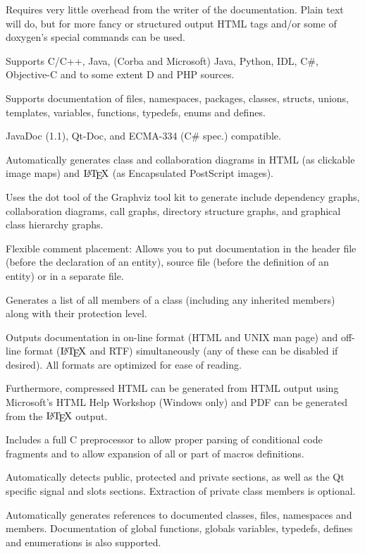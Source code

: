 \begin{DoxyItemize}
\item Requires very little overhead from the writer of the documentation. Plain text will do, but for more fancy or structured output HTML tags and/or some of doxygen's special commands can be used. 
\item Supports C/C++, Java, (Corba and Microsoft) Java, Python, IDL, C\#, Objective-\/C and to some extent D and PHP sources. 
\item Supports documentation of files, namespaces, packages, classes, structs, unions, templates, variables, functions, typedefs, enums and defines. 
\item JavaDoc (1.1), Qt-\/Doc, and ECMA-\/334 (C\# spec.) compatible. 
\item Automatically generates class and collaboration diagrams in HTML (as clickable image maps) and $\mbox{\LaTeX}$ (as Encapsulated PostScript images). 
\item Uses the dot tool of the Graphviz tool kit to generate include dependency graphs, collaboration diagrams, call graphs, directory structure graphs, and graphical class hierarchy graphs. 
\item Flexible comment placement: Allows you to put documentation in the header file (before the declaration of an entity), source file (before the definition of an entity) or in a separate file. 
\item Generates a list of all members of a class (including any inherited members) along with their protection level. 
\item Outputs documentation in on-\/line format (HTML and UNIX man page) and off-\/line format ($\mbox{\LaTeX}$ and RTF) simultaneously (any of these can be disabled if desired). All formats are optimized for ease of reading. \par
 Furthermore, compressed HTML can be generated from HTML output using Microsoft's HTML Help Workshop (Windows only) and PDF can be generated from the $\mbox{\LaTeX}$ output. 
\item Includes a full C preprocessor to allow proper parsing of conditional code fragments and to allow expansion of all or part of macros definitions. 
\item Automatically detects public, protected and private sections, as well as the Qt specific signal and slots sections. Extraction of private class members is optional. 
\item Automatically generates references to documented classes, files, namespaces and members. Documentation of global functions, globals variables, typedefs, defines and enumerations is also supported. 

\end{DoxyItemize}
